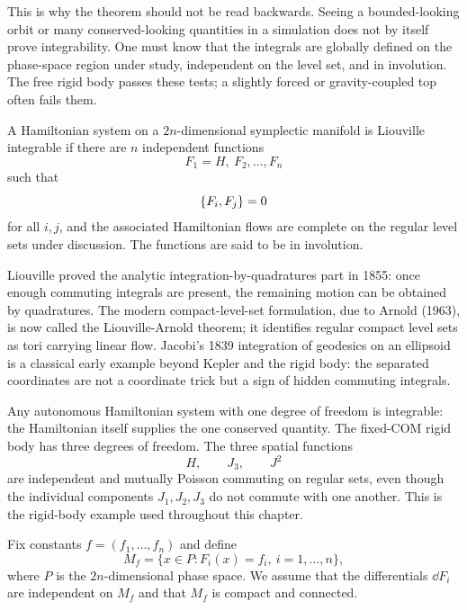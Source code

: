 This is why the theorem should not be read backwards. Seeing a bounded-looking
orbit or many conserved-looking quantities in a simulation does not by itself
prove integrability. One must know that the integrals are globally defined on
the phase-space region under study, independent on the level set, and in
involution. The free rigid body passes these tests; a slightly forced or
gravity-coupled top often fails them.

\begin{definition}
A Hamiltonian system on a \(2n\)-dimensional symplectic manifold is Liouville
integrable if there are \(n\) independent functions
\[
  F_1=H,\ F_2,\ldots,F_n
\]
such that
\[
  \left\{F_i,F_j\right\}=0
\]
for all \(i,j\), and the associated Hamiltonian flows are complete on the
regular level sets under discussion. The functions are said to be in
involution.
\end{definition}

Liouville proved the analytic integration-by-quadratures part in 1855: once
enough commuting integrals are present, the remaining motion can be obtained by
quadratures. The modern compact-level-set formulation, due to Arnold (1963), is
now called the Liouville-Arnold theorem; it identifies regular compact level
sets as tori carrying linear flow.
Jacobi's 1839 integration of geodesics on an ellipsoid is a classical early
example beyond Kepler and the rigid body: the separated coordinates are not a
coordinate trick but a sign of hidden commuting integrals.

\begin{example}
Any autonomous Hamiltonian system with one degree of freedom is integrable: the
Hamiltonian itself supplies the one conserved quantity. The fixed-COM rigid body
has three degrees of freedom. The three spatial functions
\[
  H,\qquad J_3,\qquad J^2
\]
are independent and mutually Poisson commuting on regular sets, even though the
individual components \(J_1,J_2,J_3\) do not commute with one another. This is
the rigid-body example used throughout this chapter.
\end{example}

\begin{hypothesis}
Fix constants \(f=(f_1,\ldots,f_n)\) and define
\[
  M_f=\{x\in P: F_i(x)=f_i,\ i=1,\ldots,n\},
\]
where \(P\) is the \(2n\)-dimensional phase space. We assume that the
differentials \(\dd F_i\) are independent on \(M_f\) and that \(M_f\) is
compact and connected.
\end{hypothesis}

